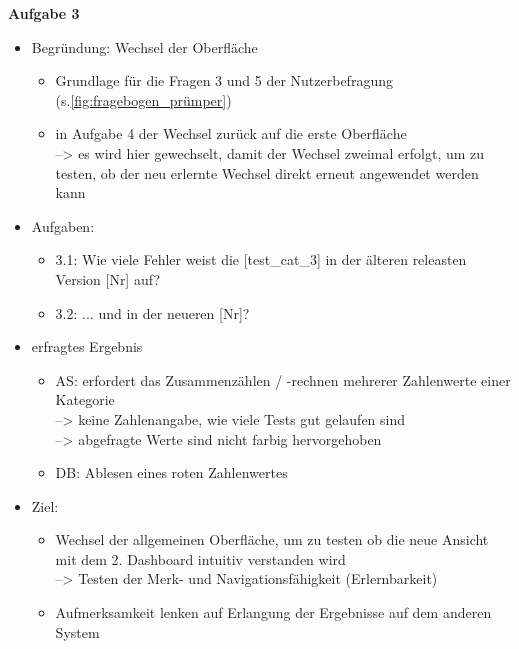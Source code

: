\newpage
\noindent
\textbf{Aufgabe 3}
\begin{itemize}
    \item Begründung: Wechsel der Oberfläche
    \begin{itemize}
        \item Grundlage für die Fragen 3 und 5 der Nutzerbefragung\\ (s.\autoref{fig:fragebogen_prümper})
        \item in Aufgabe 4 der Wechsel zurück auf die erste Oberfläche\\
                --> es wird hier gewechselt, damit der Wechsel zweimal erfolgt, um zu testen, ob der neu erlernte Wechsel direkt erneut angewendet werden kann
    \end{itemize}
    \item Aufgaben:
    \begin{itemize}
        \item 3.1: Wie viele Fehler weist die [test\_cat\_3] in der älteren releasten Version [Nr] auf?
        \item 3.2: ... und in der neueren [Nr]?
    \end{itemize}
    \item erfragtes Ergebnis
    \begin{itemize}
        \item AS: erfordert das Zusammenzählen / -rechnen mehrerer Zahlenwerte einer Kategorie\\
                --> keine Zahlenangabe, wie viele Tests gut gelaufen sind\\
                --> abgefragte Werte sind nicht farbig hervorgehoben
        \item DB: Ablesen eines roten Zahlenwertes
    \end{itemize}
    \item Ziel:
    \begin{itemize}
        \item Wechsel der allgemeinen Oberfläche, um zu testen ob die neue Ansicht mit dem 2. Dash\-board intuitiv verstanden wird\\
                --> Testen der Merk- und Navigationsfähigkeit (Erlernbarkeit)
        \item Aufmerksamkeit lenken auf Erlangung der Ergebnisse auf dem anderen System
    \end{itemize}
\end{itemize}

